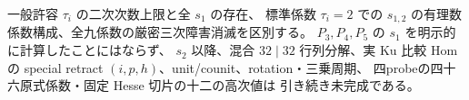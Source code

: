 \begin{remark}[到達範囲]
一般許容 $\tau_i$ の二次次数上限と全 $s_1$ の存在、
標準係数 $\tau_i=2$ での $s_{1,2}$ の有理数係数構成、全九係数の厳密三次障害消滅を区別する。
$P_3,P_4,P_5$ の $s_1$ を明示的に計算したことにはならず、
$s_2$ 以降、混合 $32\mid32$ 行列分解、実 Ku 比較 Hom の
special retract $(i,p,h)$、unit/counit、rotation・三乗周期、
四probeの四十六原式係数・固定 Hesse 切片の十二の高次値は
引き続き未完成である。
\end{remark}
